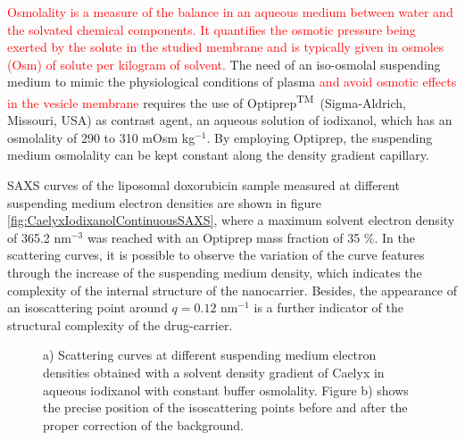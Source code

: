 

\textcolor{red}{Osmolality is a measure of the balance in an aqueous medium between water and the solvated chemical components. It quantifies the osmotic pressure being exerted by the solute in the studied membrane and is typically given in osmoles (Osm) of solute per kilogram of solvent.} The need of an iso-osmolal suspending medium to mimic the physiological conditions of plasma \textcolor{red}{and avoid osmotic effects in the vesicle membrane} requires the use of Optiprep\textsuperscript{TM}\ (Sigma-Aldrich, Missouri, USA) as contrast agent, an aqueous solution of iodixanol, which has an osmolality of 290 to 310 mOsm kg$^{-1}$. By employing Optiprep, the suspending medium osmolality can be kept constant along the density gradient capillary.
 
SAXS curves of the liposomal doxorubicin sample measured at different suspending medium electron densities are shown in figure \ref{fig:CaelyxIodixanolContinuousSAXS}, where a maximum solvent electron density of 365.2 nm$^{-3}$ was reached with an Optiprep mass fraction of 35 $\%$. In the scattering curves, it is possible to observe the variation of the curve features through the increase of the suspending medium density, which indicates the complexity of the internal structure of the nanocarrier. Besides, the appearance of an isoscattering point around $q = 0.12$ nm$^{-1}$ is a further indicator of the structural complexity of the drug-carrier.

\begin{figure}
	\centering
		\qquad
		\caption[Continuous contrast variation experimental data of Caelyx.]{ a) Scattering curves at different suspending medium electron densities obtained with a solvent density gradient of Caelyx in aqueous iodixanol with constant buffer osmolality. Figure b) shows the precise position of the isoscattering points before and after the proper correction of the background.}
\end{figure}

